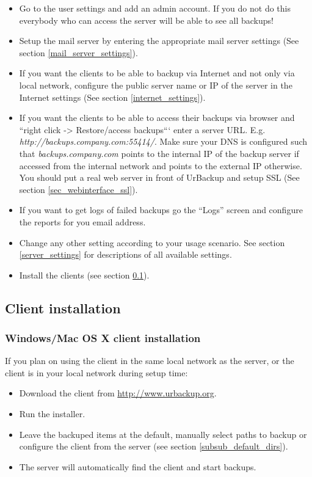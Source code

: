 \documentclass[a4paper,10pt]{article}
\begin{document}
\begin{itemize}
  \item Go to the user settings and add an admin account. If you do not do this everybody who can access the server will be able to see all backups!
  \item Setup the mail server by entering the appropriate mail server settings (See section \ref{mail_server_settings}).
  \item If you want the clients to be able to backup via Internet and not only via local network, configure the public server name or IP of the server in the Internet settings (See section \ref{internet_settings}).
  \item If you want the clients to be able to access their backups via browser and ``right click -> Restore/access backups``` enter a server URL. E.g. \textsl{http://backups.company.com:55414/}. Make sure your DNS is configured such that \textsl{backups.company.com} points to the internal IP of the backup server if accessed from the internal network and points to the external IP otherwise. You should put a real web server in front of UrBackup and setup SSL (See section \ref{sec_webinterface_ssl}).  
  \item If you want to get logs of failed backups go the ``Logs'' screen and configure the reports for you email address.
  \item Change any other setting according to your usage scenario. See section \ref{server_settings} for descriptions of all available settings.
  \item Install the clients (see section \ref{client_installation}).
\end{itemize}

\subsection{Client installation}
\label{client_installation}

\subsubsection{Windows/Mac OS X client installation}

\noindent If you plan on using the client in the same local network as the server, or the client is in your local network during setup time:

\begin{itemize}
  \item Download the client from \url{http://www.urbackup.org}.
  \item Run the installer.
  \item Leave the backuped items at the default, manually select paths to backup or configure the client from the server (see section \ref{subsub_default_dirs}).
  \item The server will automatically find the client and start backups.
\end{itemize}
\end{document}
